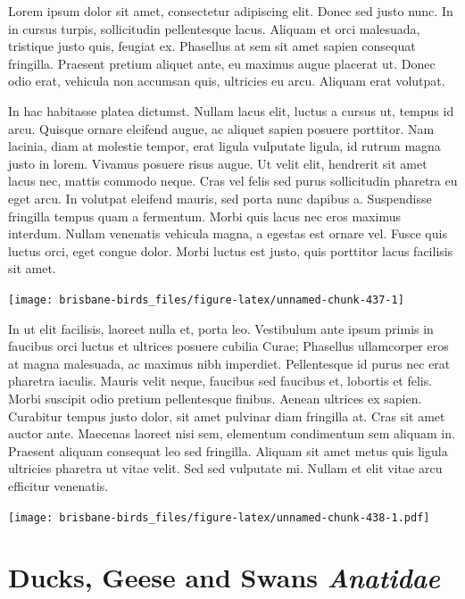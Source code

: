 \documentclass[]{book}
\let\origfigure\figure
\let\endorigfigure\endfigure
\renewenvironment{figure}[1][2] {
  \expandafter\origfigure\expandafter[H]
} {
  \endorigfigure
}
\begin{document}
Lorem ipsum dolor sit amet, consectetur adipiscing elit. Donec sed justo
nunc. In in cursus turpis, sollicitudin pellentesque lacus. Aliquam et
orci malesuada, tristique justo quis, feugiat ex. Phasellus at sem sit
amet sapien consequat fringilla. Praesent pretium aliquet ante, eu
maximus augue placerat ut. Donec odio erat, vehicula non accumsan quis,
ultricies eu arcu. Aliquam erat volutpat.

In hac habitasse platea dictumst. Nullam lacus elit, luctus a cursus ut,
tempus id arcu. Quisque ornare eleifend augue, ac aliquet sapien posuere
porttitor. Nam lacinia, diam at molestie tempor, erat ligula vulputate
ligula, id rutrum magna justo in lorem. Vivamus posuere risus augue. Ut
velit elit, hendrerit sit amet lacus nec, mattis commodo neque. Cras vel
felis sed purus sollicitudin pharetra eu eget arcu. In volutpat eleifend
mauris, sed porta nunc dapibus a. Suspendisse fringilla tempus quam a
fermentum. Morbi quis lacus nec eros maximus interdum. Nullam venenatis
vehicula magna, a egestas est ornare vel. Fusce quis luctus orci, eget
congue dolor. Morbi luctus est justo, quis porttitor lacus facilisis sit
amet.

\begin{figure}
\texttt{[image: brisbane-birds\_files/figure-latex/unnamed-chunk-437-1]} \caption{insert figure caption}\label{fig:unnamed-chunk-437}
\end{figure}

In ut elit facilisis, laoreet nulla et, porta leo. Vestibulum ante ipsum
primis in faucibus orci luctus et ultrices posuere cubilia Curae;
Phasellus ullamcorper eros at magna malesuada, ac maximus nibh
imperdiet. Pellentesque id purus nec erat pharetra iaculis. Mauris velit
neque, faucibus sed faucibus et, lobortis et felis. Morbi suscipit odio
pretium pellentesque finibus. Aenean ultrices ex sapien. Curabitur
tempus justo dolor, sit amet pulvinar diam fringilla at. Cras sit amet
auctor ante. Maecenas laoreet nisi sem, elementum condimentum sem
aliquam in. Praesent aliquam consequat leo sed fringilla. Aliquam sit
amet metus quis ligula ultricies pharetra ut vitae velit. Sed sed
vulputate mi. Nullam et elit vitae arcu efficitur venenatis.

\begin{figure}
\centering
\texttt{[image: brisbane-birds\_files/figure-latex/unnamed-chunk-438-1.pdf]}
\caption{\label{fig:unnamed-chunk-438}insert figure caption}
\end{figure}

\chapter{\texorpdfstring{Ducks, Geese and Swans
\emph{Anatidae}}{Ducks, Geese and Swans Anatidae}}\label{ducks-geese-and-swans-anatidae}
\end{document}
